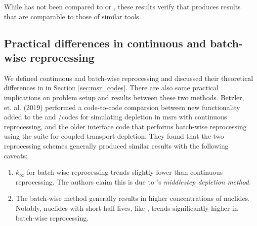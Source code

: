 While \SaltProc has not been compared to \SCALE or \ADDER, these results verify
that \SaltProc produces results that are comparable to those of similar tools.


\subsection{Practical differences in continuous and batch-wise reprocessing}
We defined continuous and batch-wise reprocessing and discussed their
theoretical differences in in Section \ref{sec:msr_codes}. There are also some
practical implications on problem setup and results between these two methods.
Betzler, et. al. (2019) \cite{betzler_molten_2019} performed a code-to-code
comparsion between new functionality added to the \ORIGEN and \SCALE/\TRITON codes
for simulating depletion in \Gls{msr}s with continuous reprocessing, and the
older \ChemTriton\cite{betzler_molten_2017} interface code that performs
batch-wise reprocessing using the \SCALE suite for coupled transport-depletion.
They found that the two reprocessing schemes generally produced similar results
with the following caveats:
\begin{enumerate}
    \item $k_{\infty}$ for batch-wise reprocessing trends slightly lower than  continuous reprocessing. The authors claim this is due to \SCALE's {\it middlestep depletion method}. 
    \item The batch-wise method generally results in higher concentrations of nuclides. Notably, nuclides with short half lives, like , trends significantly higher in batch-wise reprocessing.
\end{enumerate}


